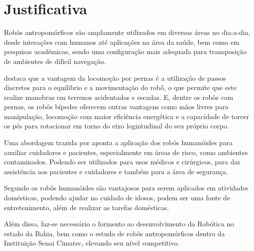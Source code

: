 \section{Justificativa}
\label{sec:justi}

Robôs antropomórficos são amplamente utilizados em diversas áreas no dia-a-dia, desde interações com humanos até aplicações na área da saúde, bem como em pesquisas acadêmicas, sendo uma configuração mais adequada para transposição de ambientes de difícil navegação.

 destaca que a vantagem da locomoção por pernas é a utilização de passos discretos para o equilibrio e a movimentação do robô, o que permite que este realize manobras em terrenos acidentados e escadas. E, dentre os robôs com pernas, os robôs bípedes oferecem outras vantagens como mãos livres para manipulação, locomoção com maior eficiência energética e a capacidade de torcer os pés para rotacionar em torno do eixo logintudinal do seu próprio corpo.

Uma abordagem trazida por  aponta a aplicação dos robôs humanóides para auxiliar cuidadores e pacientes, especialmente em áreas de risco, como ambientes contaminados. Podendo ser utilizados para usos médicos e cirúrgicos, para dar assistência aos pacientes e cuidadores e também para a área de segurança.

Segundo  os robôs humanóides são vantajosos para serem aplicados em atividades domésticas, podendo ajudar no cuidado de idosos, podem ser uma fonte de entretenimento, além de realizar as tarefas domésticas.

Além disso, faz-se necessário o formento ao desenvolvimento da Robótica no estado da Bahia, bem como o estudo de robôs antropomórficos dentro da Instituição Senai Cimatec, elevando seu nível competitivo.







